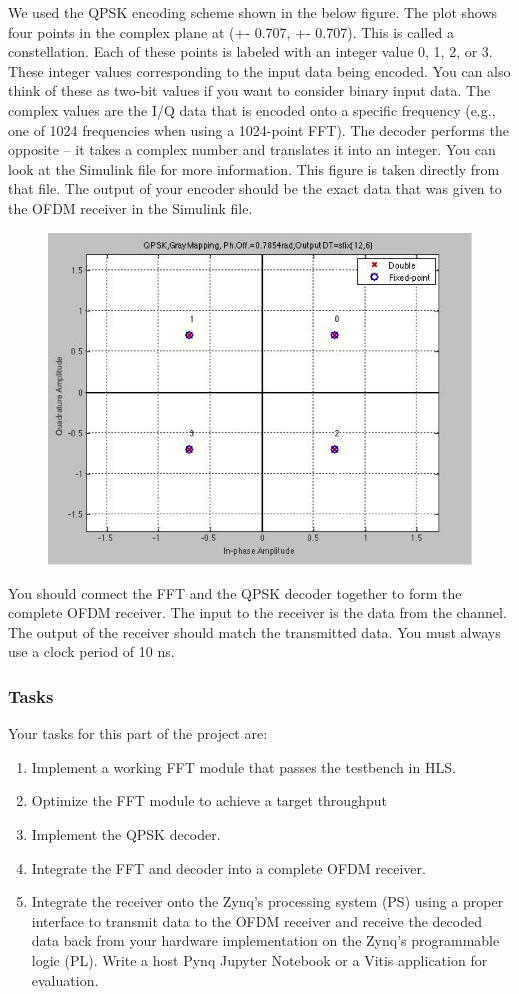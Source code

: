 \documentclass[a4paper,12pt,twoside]{article}
\begin{document}
We used the QPSK encoding scheme shown in the below figure. The plot shows four points in the complex plane at (+- 0.707, +- 0.707). This is called a constellation. Each of these points is labeled with an integer value 0, 1, 2, or 3. These integer values corresponding to the input data being encoded. You can also think of these as two-bit values if you want to consider binary input data. The complex values are the I/Q data that is encoded onto a specific frequency (e.g., one of 1024 frequencies when using a 1024-point FFT). The decoder performs the opposite – it takes a complex number and translates it into an integer. You can look at the Simulink file for more information. This figure is taken directly from that file. The output of your encoder should be the exact data that was given to the OFDM receiver in the Simulink file.
\begin{figure}[H]
    \centering
    \includegraphics[width=\textwidth]{images/10.png}
\end{figure}
You should connect the FFT and the QPSK decoder together to form the complete OFDM receiver. The input to the receiver is the data from the channel. The output of the receiver should match the transmitted data. You must always use a clock period of 10 ns.
\subsubsection{Tasks}
Your tasks for this part of the project are:
\begin{enumerate}
    \item Implement a working FFT module that passes the testbench in HLS.
    \item Optimize the FFT module to achieve a target throughput
    \item Implement the QPSK decoder.
    \item Integrate the FFT and decoder into a complete OFDM receiver.
    \item Integrate the receiver onto the Zynq’s processing system (PS) using a proper interface to transmit data to the OFDM receiver and receive the decoded data back from your hardware implementation on the Zynq’s programmable logic (PL). Write a host Pynq Jupyter Notebook or a Vitis application for evaluation.
\end{enumerate}
\end{document}
